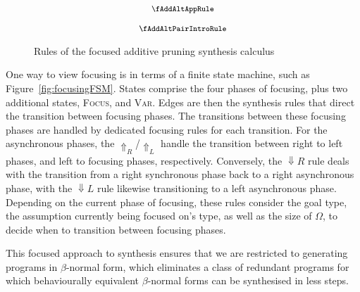 \begin{figure}[H]
  \begin{align*}
    {\footnotesize{
\begin{array}{c}
\fAddAltAppRule
  \\[1.25em]
\fAddAltPairIntroRule
  \end{array}
    }}
  \end{align*}
  \caption{Rules of the focused additive pruning synthesis calculus}
  \label{fig:focus-add-pruning}
\end{figure}

One way to view focusing is in terms of a finite state machine, such as
Figure~\ref{fig:focusingFSM}. States comprise the four phases of focusing, plus
two additional states, \textsc{Focus}, and \textsc{Var}. Edges are then the
synthesis rules that direct the transition between focusing phases. The
transitions between these focusing phases are handled by dedicated focusing
rules for each transition. For the asynchronous phases, the
$\Uparrow_{R}$/$\Uparrow_{L}$ handle the transition between right to left
phases, and left to focusing phases, respectively. Conversely, the
$\Downarrow{R}$ rule deals with the transition from a right synchronous phase
back to a right asynchronous phase, with the $\Downarrow{L}$ rule likewise
transitioning to a left asynchronous phase. Depending on the current phase of
focusing, these rules consider the goal type, the assumption currently being
focused on's type, as well as the size of $\Omega$, to decide when to
transition between focusing phases. 

This focused approach to synthesis ensures that we are restricted to generating
programs in $\beta$-normal form, which eliminates a class of redundant programs
for which behaviourally equivalent $\beta$-normal forms can be synthesised in
less steps.


